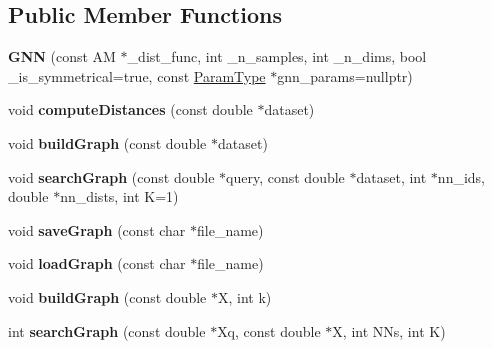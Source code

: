 \subsection*{Public Member Functions}
\begin{DoxyCompactItemize}
\item 
\hypertarget{classgnn_1_1GNN_a3ef3c7eca7fa61304ded6b74e736b9c3}{{\bfseries G\-N\-N} (const A\-M $\ast$\-\_\-dist\-\_\-func, int \-\_\-n\-\_\-samples, int \-\_\-n\-\_\-dims, bool \-\_\-is\-\_\-symmetrical=true, const \hyperlink{structgnn_1_1GNNParams}{Param\-Type} $\ast$gnn\-\_\-params=nullptr)}\label{classgnn_1_1GNN_a3ef3c7eca7fa61304ded6b74e736b9c3}

\item 
\hypertarget{classgnn_1_1GNN_a041899e3872c67753c7f6635691ef45d}{void {\bfseries compute\-Distances} (const double $\ast$dataset)}\label{classgnn_1_1GNN_a041899e3872c67753c7f6635691ef45d}

\item 
\hypertarget{classgnn_1_1GNN_a895f34aeb9d6c1f2a40e23b2dba36a65}{void {\bfseries build\-Graph} (const double $\ast$dataset)}\label{classgnn_1_1GNN_a895f34aeb9d6c1f2a40e23b2dba36a65}

\item 
\hypertarget{classgnn_1_1GNN_a7b56ab242b2b0aaaf4e1377521d9fb20}{void {\bfseries search\-Graph} (const double $\ast$query, const double $\ast$dataset, int $\ast$nn\-\_\-ids, double $\ast$nn\-\_\-dists, int K=1)}\label{classgnn_1_1GNN_a7b56ab242b2b0aaaf4e1377521d9fb20}

\item 
\hypertarget{classgnn_1_1GNN_aef78402a962fca21ff078de246714e6c}{void {\bfseries save\-Graph} (const char $\ast$file\-\_\-name)}\label{classgnn_1_1GNN_aef78402a962fca21ff078de246714e6c}

\item 
\hypertarget{classgnn_1_1GNN_a460a8d8c984558c55f28c4d7b54c5e18}{void {\bfseries load\-Graph} (const char $\ast$file\-\_\-name)}\label{classgnn_1_1GNN_a460a8d8c984558c55f28c4d7b54c5e18}

\item 
\hypertarget{classgnn_1_1GNN_a8c8cf493de68e3abad95d8c5413e5375}{void {\bfseries build\-Graph} (const double $\ast$X, int k)}\label{classgnn_1_1GNN_a8c8cf493de68e3abad95d8c5413e5375}

\item 
\hypertarget{classgnn_1_1GNN_aef87dcda4d56d55e17712e204ead65c1}{int {\bfseries search\-Graph} (const double $\ast$Xq, const double $\ast$X, int N\-Ns, int K)}\label{classgnn_1_1GNN_aef87dcda4d56d55e17712e204ead65c1}

\end{DoxyCompactItemize}
